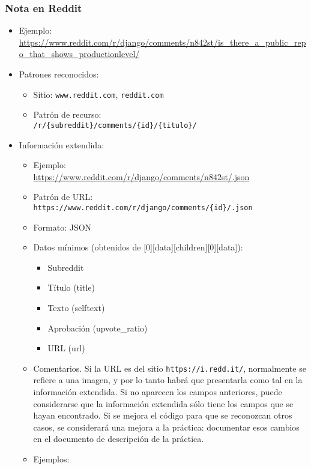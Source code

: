 \subsubsection{Nota en Reddit}

\begin{itemize}
  \item Ejemplo: \\
    \url{https://www.reddit.com/r/django/comments/n842st/is_there_a_public_repo_that_shows_productionlevel/}
  \item Patrones reconocidos:
    \begin{itemize}
    \item Sitio: \texttt{www.reddit.com}, \texttt{reddit.com}
    \item Patrón de recurso: \\
      \texttt{/r/\{subreddit\}/comments/\{id\}/\{titulo\}/}
    \end{itemize}
  \item Información extendida:
    \begin{itemize}
    \item Ejemplo: \\
      \url{https://www.reddit.com/r/django/comments/n842st/.json}
    \item Patrón de URL:\\
      \texttt{https://www.reddit.com/r/django/comments/\{id\}/.json}\\
    \item Formato: JSON
    \item Datos mínimos (obtenidos de [0][data][children][0][data]):
      \begin{itemize}
      \item Subreddit
      \item Título (title)
      \item Texto (selftext)
      \item Aprobación (upvote\_ratio)
      \item URL (url)
      \end{itemize}
    \item Comentarios. Si la URL es del sitio \texttt{https://i.redd.it/}, normalmente se refiere a una imagen, y por lo tanto habrá que presentarla como tal en la información extendida. Si no aparecen los campos anteriores, puede considerarse que la información extendida sólo tiene los campos que se hayan encontrado. Si se mejora el código para que se reconozcan otros casos, se considerará una mejora a la práctica: documentar esos cambios en el documento de descripción de la práctica.
    \item Ejemplos:


\end{itemize}
\end{itemize}
